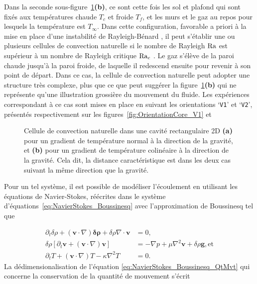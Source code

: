 Dans la seconde sous-figure~\ref{fig:SimuConvNat2D}\textbf{(b)}, ce sont cette fois les sol et plafond qui sont fixés aux températures chaude $T_c$ et froide $T_f$, et les murs et le gaz au repos pour lesquels la température est $T_\infty$. Dans cette configuration, favorable a priori à la mise en place d'une instabilité de \og Rayleigh-Bénard \fg{}, il peut s'établir une ou plusieurs cellules de convection naturelle si le nombre de Rayleigh $\mathrm{Ra}$ est supérieur à un nombre de Rayleigh critique $\mathrm{Ra}_c$ . Le gaz s'élève de la paroi chaude jusqu'à la paroi froide, de laquelle il redescend ensuite pour revenir à son point de départ. Dans ce cas, la cellule de convection naturelle peut adopter une structure très complexe, plus que ce que peut suggérer la figure~\ref{fig:SimuConvNat2D}\textbf{(b)} qui ne représente qu'une illustration grossière du mouvement du fluide. Les expériences correspondant à ce cas sont mises en place en suivant les orientations `\texttt{V1}' et `\texttt{V2}', présentés respectivement sur les figures~\ref{fig:OrientationCore_V1} et 

\begin{figure}[!ht]
    \centering
    
    \caption{Cellule de convection naturelle dans une cavité rectangulaire 2D \textbf{(a)} pour un gradient de température normal à la direction de la gravité, et \textbf{(b)} pour un gradient de température colinéaire à la direction de la gravité. Cela dit, la distance caractéristique est  dans les deux cas suivant la même direction que la gravité.}
    \label{fig:SimuConvNat2D}
\end{figure}



Pour un tel système, il est possible de modéliser l'écoulement en utilisant les équations de Navier-Stokes, réécrites dans le système d'équations~\eqref{eq:NavierStokes_Boussinesq} avec l'approximation de Boussinesq tel que

\begin{subequations}
	\begin{align}
		\partial_t \delta\rho + (\mathbf v \cdot \nabla)\mathbf{\delta\rho} + \delta\rho \nabla \cdot \mathbf{v} &= 0, \label{eq:NavierStokes_Boussinesq_Conti}\\
		\delta\rho [\partial_t \mathbf v + (\mathbf v \cdot \nabla)\mathbf v] &= -\nabla p + \mu \nabla^2 \mathbf v + \delta\rho \mathbf g, \text{et}\label{eq:NavierStokes_Boussinesq_QtMvt}\\
		\partial_t T + (\mathbf v \cdot \nabla) T - \kappa\nabla^2T &= 0. \label{eq:NavierStokes_Boussinesq_NRJinterne}
	\end{align}
	\label{eq:NavierStokes_Boussinesq}%
\end{subequations}
La dédimensionalisation de l'équation \eqref{eq:NavierStokes_Boussinesq_QtMvt} qui concerne la conservation de la quantité de mouvement s'écrit

